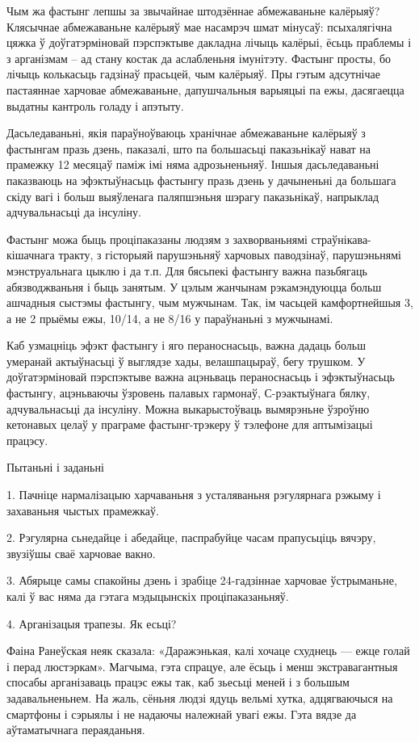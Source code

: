 Чым жа фастынг лепшы за звычайнае штодзённае абмежаваньне калёрыяў? Клясычнае абмежаваньне калёрыяў мае насамрэч шмат мінусаў: псыхалягічна цяжка ў доўгатэрміновай пэрспэктыве дакладна лічыць калёрыі, ёсьць праблемы і з арганізмам – ад стану костак да аслабленьня імунітэту. Фастынг просты, бо лічыць колькасьць гадзінаў прасьцей, чым калёрыяў. Пры гэтым адсутнічае пастаяннае харчовае абмежаваньне, дапушчальныя варыяцыі па ежы, дасягаецца выдатны кантроль голаду і апэтыту.

Дасьледаваньні, якія параўноўваюць хранічнае абмежаваньне калёрыяў з фастынгам празь дзень, паказалі, што па большасьці паказьнікаў нават на прамежку 12 месяцаў паміж імі няма адрозьненьняў. Іншыя дасьледаваньні паказваюць на эфэктыўнасьць фастынгу празь дзень у дачыненьні да большага скіду вагі і больш выяўленага паляпшэньня шэрагу паказьнікаў, напрыклад адчувальнасьці да інсуліну.

Фастынг можа быць проціпаказаны людзям з захворваньнямі страўнікава-кішачнага тракту, з гісторыяй парушэньняў харчовых паводзінаў, парушэньнямі мэнструальнага цыклю і да т.п. Для бясьпекі фастынгу важна пазьбягаць абязводжваньня і быць занятым. У цэлым жанчынам рэкамэндуюцца больш ашчадныя сыстэмы фастынгу, чым мужчынам. Так, ім часьцей камфортнейшыя 3, а не 2 прыёмы ежы, 10/14, а не 8/16 у параўнаньні з мужчынамі.

Каб узмацніць эфэкт фастынгу і яго пераноснасьць, важна дадаць больш умеранай актыўнасьці ў выглядзе хады, велашпацыраў, бегу трушком. У доўгатэрміновай пэрспэктыве важна ацэньваць пераноснасьць і эфэктыўнасьць фастынгу, ацэньваючы ўзровень палавых гармонаў, С-рэактыўнага бялку, адчувальнасьці да інсуліну. Можна выкарыстоўваць вымярэньне ўзроўню кетонавых целаў у праграме фастынг-трэкеру ў тэлефоне для аптымізацыі працэсу.

Пытаньні і заданьні

1. Пачніце нармалізацыю харчаваньня з усталяваньня рэгулярнага рэжыму і захаваньня чыстых прамежкаў.

2. Рэгулярна сьнедайце і абедайце, паспрабуйце часам прапусьціць вячэру, звузіўшы сваё харчовае вакно.

3. Абярыце самы спакойны дзень і зрабіце 24-гадзіннае харчовае ўстрыманьне, калі ў вас няма да гэтага мэдыцынскіх проціпаказаньняў.


4. Арганізацыя трапезы. Як есьці?

Фаіна Ранеўская неяк сказала: «Даражэнькая, калі хочаце схуднець — ежце голай і перад люстэркам». Магчыма, гэта спрацуе, але ёсьць і менш экстравагантныя спосабы арганізаваць працэс ежы так, каб зьесьці меней і з большым задавальненьнем. На жаль, сёньня людзі ядуць вельмі хутка, адцягваючыся на смартфоны і сэрыялы і не надаючы належнай увагі ежы. Гэта вядзе да аўтаматычнага пераяданьня.

